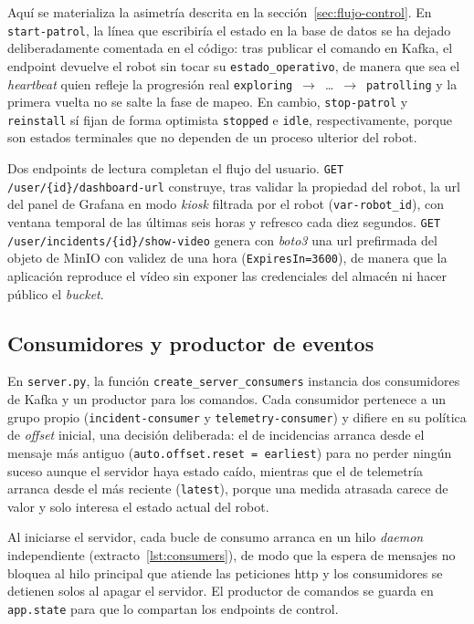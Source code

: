 Aquí se materializa la asimetría descrita en la sección~\ref{sec:flujo-control}. En
\texttt{start-patrol}, la línea que escribiría el estado en la base de datos se ha
dejado deliberadamente comentada en el código: tras
publicar el comando en Kafka, el endpoint devuelve el robot sin tocar su
\texttt{estado\_operativo}, de manera que sea el \textit{heartbeat} quien refleje la
progresión real \texttt{exploring}~$\rightarrow$~\dots~$\rightarrow$~\texttt{patrolling}
y la primera vuelta no se salte la fase de mapeo. En cambio, \texttt{stop-patrol} y
\texttt{reinstall} sí fijan de forma optimista \texttt{stopped} e \texttt{idle},
respectivamente, porque son estados terminales que no dependen de un proceso ulterior
del robot.

Dos endpoints de lectura completan el flujo del usuario. \texttt{GET
/user/\{id\}/dashboard-url} construye, tras validar la propiedad del robot, la
\acrshort{url} del panel de Grafana en modo \textit{kiosk} filtrada por el robot
(\texttt{var-robot\_id}), con ventana temporal de las últimas seis horas y refresco
cada diez segundos. \texttt{GET /user/incidents/\{id\}/show-video} genera con
\textit{boto3} una \acrshort{url} prefirmada del objeto de MinIO con validez de una hora
(\texttt{ExpiresIn=3600}), de manera que la aplicación reproduce el vídeo sin exponer
las credenciales del almacén ni hacer público el \textit{bucket}.

\subsection{Consumidores y productor de eventos}
\label{sec:consumidores}

En \texttt{server.py}, la función \texttt{create\_server\_consumers} instancia dos
consumidores de Kafka y un productor para los comandos. Cada consumidor pertenece a
un grupo propio (\texttt{incident-consumer} y \texttt{telemetry-consumer}) y difiere
en su política de \textit{offset} inicial, una decisión deliberada: el de incidencias
arranca desde el mensaje más antiguo (\texttt{auto.offset.reset = earliest}) para no
perder ningún suceso aunque el servidor haya estado caído, mientras que el de
telemetría arranca desde el más reciente (\texttt{latest}), porque una medida atrasada
carece de valor y solo interesa el estado actual del robot.

Al iniciarse el servidor, cada bucle de consumo arranca en un hilo \textit{daemon}
independiente (extracto~\ref{lst:consumers}), de modo que la espera de mensajes no
bloquea al hilo principal que atiende las peticiones \gls{http} y los consumidores se
detienen solos al apagar el servidor. El productor de comandos se guarda en
\texttt{app.state} para que lo compartan los endpoints de control.

